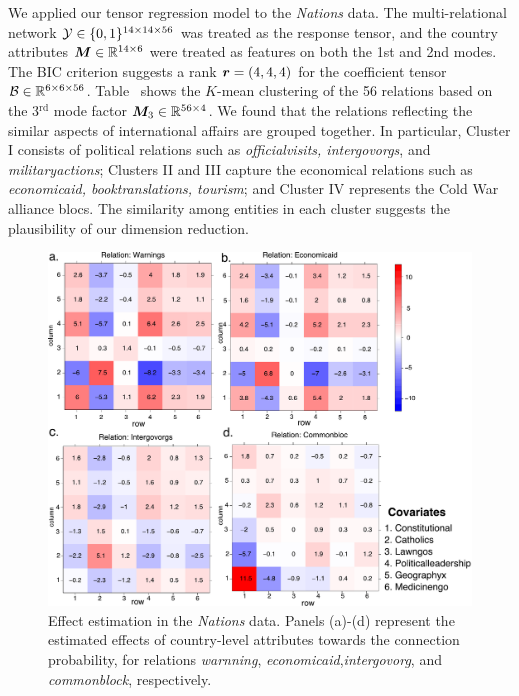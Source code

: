\documentclass[12pt]{article}
\theoremstyle{plain}
\theoremstyle{definition}
\begin{document}
We applied our tensor regression model to the \emph{Nations} data. The multi-relational network $\mathcal{Y}\in\{0,1\}^{14\times 14\times 56}$ was treated as the response tensor, and the country attributes $\bm M\in\mathbb{R}^{14\times 6}$ were treated as features on both the 1st and 2nd modes. The BIC criterion suggests a rank $\bm{r}=(4,4,4)$ for the coefficient tensor $\mathcal{B}\in\mathbb{R}^{6\times 6 \times 56}$. Table~ shows the $K$-mean clustering of the 56 relations based on the 3$^\text{rd}$ mode factor $\bm M_3\in\mathbb{R}^{56\times 4}$. We found that the relations reflecting the similar aspects of international affairs are grouped together. In particular, Cluster I consists of political relations such as \emph{officialvisits, intergovorgs}, and \emph{militaryactions}; Clusters II and III capture the economical relations such as \emph{economicaid, booktranslations, tourism}; and Cluster IV represents the Cold War alliance blocs. The similarity among entities in each cluster suggests the plausibility of our dimension reduction. 


\begin{figure}[H]
\centering
\includegraphics[width=14cm]{coef.pdf}
\caption{Effect estimation in the \emph{Nations} data. Panels (a)-(d) represent the estimated effects of country-level attributes towards the connection probability, for relations \emph{warnning}, \emph{economicaid},\emph{intergovorg}, and \emph{commonblock}, respectively. }\label{fig:est}
\end{figure}
\end{document}
